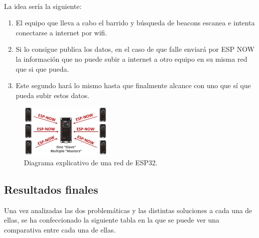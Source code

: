 \documentclass[paper=a4, fontsize=11pt,twoside]{scrartcl}	%
\begin{document}
\begin{enumerate}
            \paragraph{}
            La idea sería la siguiente:
            \begin{enumerate}
                \item El equipo que lleva a cabo el barrido y búsqueda de beacons escanea e intenta conectarse a 
                internet por wifi.
                \item Si lo consigue publica los datos, en el caso de que falle enviará por ESP NOW la información
                que no puede subir a internet a otro equipo en su misma red que si que pueda.
                \item Este segundo hará lo mismo hasta que finalmente alcance con uno que sí que pueda subir estos datos.
            \end{enumerate}
            \begin{center}
                \begin{figure}[ht]
                    \centering
                    \includegraphics[width=0.4\textwidth]{espnow.PNG}
                    \caption{Diagrama explicativo de una red de ESP32.}
                    \label{fig:mesh4}
                \end{figure}
            \end{center}
        \end{enumerate}
    \subsection{Resultados finales}
        Una vez analizadas las dos problemáticas y las distintas soluciones a cada una de ellas, se ha confeccionado la siguiente tabla 
        en la que se puede ver una comparativa entre cada una de ellas.
\end{document}
